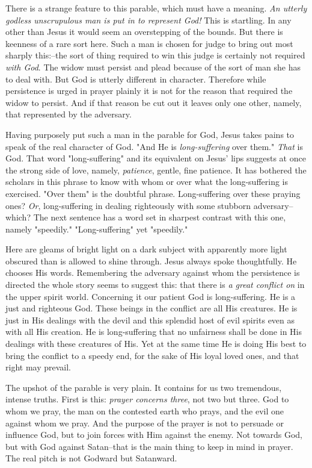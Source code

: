 There is a strange feature to this parable, which must have a meaning. \textit{An
utterly godless unscrupulous man is put in to represent God!} This is
startling. In any other than Jesus it would seem an overstepping of the
bounds. But there is keenness of a rare sort here. Such a man is chosen
for judge to bring out most sharply this:--the sort of thing required to
win this judge is certainly not required \textit{with God}. The widow must
persist and plead because of the sort of man she has to deal with. But God
is utterly different in character. Therefore while persistence is urged in
prayer plainly it is not for the reason that required the widow to
persist. And if that reason be cut out it leaves only one other, namely,
that represented by the adversary.

Having purposely put such a man in the parable for God, Jesus takes pains
to speak of the real character of God. "And He is \textit{long-suffering} over
them." \textit{That} is God. That word "long-suffering" and its equivalent on
Jesus' lips suggests at once the strong side of love, namely, \textit{patience},
gentle, fine patience. It has bothered the scholars in this phrase to know
with whom or over what the long-suffering is exercised. "Over them" is the
doubtful phrase. Long-suffering over these praying ones? \textit{Or},
long-suffering in dealing righteously with some stubborn adversary--which?
The next sentence has a word set in sharpest contrast with this one,
namely "speedily." "Long-suffering" yet "speedily."

Here are gleams of bright light on a dark subject with apparently more
light obscured than is allowed to shine through. Jesus always spoke
thoughtfully. He chooses His words. Remembering the adversary against whom
the persistence is directed the whole story seems to suggest this: that
there is \textit{a great conflict on} in the upper spirit world. Concerning it
our patient God is long-suffering. He is a just and righteous God. These
beings in the conflict are all His creatures. He is just in His dealings
with the devil and this splendid host of evil spirits even as with all His
creation. He is long-suffering that no unfairness shall be done in His
dealings with these creatures of His. Yet at the same time He is doing His
best to bring the conflict to a speedy end, for the sake of His loyal
loved ones, and that right may prevail.

The upshot of the parable is very plain. It contains for us two
tremendous, intense truths. First is this: \textit{prayer concerns three}, not
two but three. God to whom we pray, the man on the contested earth who
prays, and the evil one against whom we pray. And the purpose of the
prayer is not to persuade or influence God, but to join forces with Him
against the enemy. Not towards God, but with God against Satan--that is
the main thing to keep in mind in prayer. The real pitch is not Godward
but Satanward.

